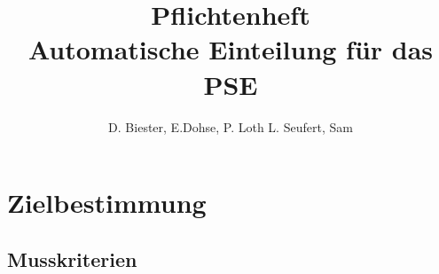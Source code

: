 \documentclass[parskip=full]{scrartcl}
\begin{document}
\title{Pflichtenheft \\
        \large Automatische Einteilung für das PSE}

\author{D. Biester, E.Dohse, P. Loth L. Seufert, Sam}
        
\maketitle
\vfill

\tableofcontents


\section{Zielbestimmung}


\subsection{Musskriterien}
\end{document}
